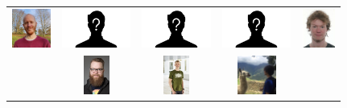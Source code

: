 \documentclass[usenames,dvipsnames,aspectratio=169,12pt]{beamer}
\begin{document}
\begin{frame}
\begin{figure}
\begin{tabular}{ccccc}
    {\includegraphics[height = 0.5in]{jeppe.png}}      &
    {\includegraphics[height = 0.5in]{aina.png}}       &
    {\includegraphics[height = 0.5in]{jakob.png}}      &
    {\includegraphics[height = 0.5in]{marit.png}}      &
    {\includegraphics[height = 0.5in]{mathias.jpg}}   \\
                                                       &
    {\includegraphics[height = 0.5in]{lau.jpg}}        &
    {\includegraphics[height = 0.5in]{soeren.jpg}}     &
    {\includegraphics[height = 0.5in]{me.jpg}}         &
    \end{tabular}
  \end{figure}
\end{frame}
\end{document}
